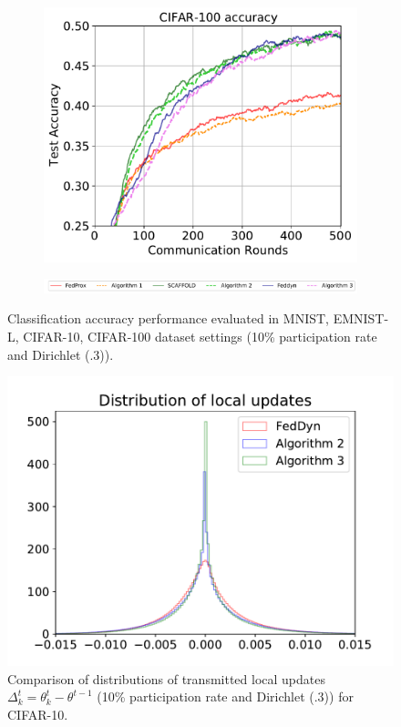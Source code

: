 \documentclass{article} %
\begin{document}
\begin{figure}[ht!]
\begin{subfigure}{.5\textwidth}
  \label{fig:sub-third}
\end{subfigure}
\begin{subfigure}{.5\textwidth}
  \centering
  \includegraphics[width=.8\linewidth]{cifar100_0.3.pdf}
  \label{fig:sub-fourth}
\end{subfigure}
\begin{subfigure}{1\textwidth}
  \centering
  \includegraphics[width=1\linewidth]{legend.pdf}
  \label{fig:sub-Fifth}
\end{subfigure}
\caption{Classification accuracy performance evaluated in MNIST, EMNIST-L, CIFAR-10, CIFAR-100 dataset settings (10\% participation rate and Dirichlet (.3)).}
\label{fig:accuracy}
\end{figure}

\begin{figure}[ht!]
  \centering  \includegraphics[width=.5\linewidth]{Distribution.pdf}  
  \caption{Comparison of distributions of transmitted local updates $\Delta_k^t = \theta_k^t - \theta^{t-1}$ (10\% participation rate and Dirichlet (.3)) for CIFAR-10.}
  \label{fig:delta_histogram}
\end{figure}
\end{document}

